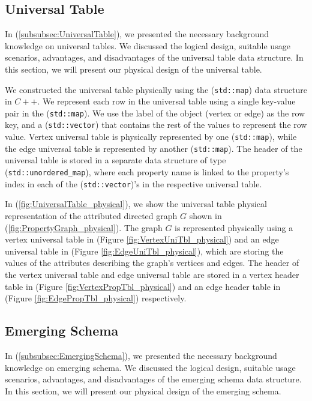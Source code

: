 {\subsection{Universal Table}
\label{subsec:PhyDesign-UniversalTable}

In (\ref{subsubsec:UniversalTable}), we presented the necessary background knowledge on universal tables. We discussed the logical design, suitable usage scenarios, advantages, and disadvantages of the universal table data structure. In this section, we will present our physical design of the universal table.

We constructed the universal table physically using the (\texttt{std::map}) data structure in $C++$. We represent each row in the universal table using a single key-value pair in the (\texttt{std::map}).  We use the label of the object (vertex or edge) as the row key, and a (\texttt{std::vector}) that contains the rest of the values to represent the row value. Vertex universal table is physically represented by one (\texttt{std::map}), while the edge universal table is represented by another (\texttt{std::map}). The header of the universal table is stored in a separate data structure of type (\texttt{std::unordered\_map}), where each property name is linked to the property's index in each of the (\texttt{std::vector})'s in the respective universal table.

In (\ref{fig:UniversalTable_physical}), we show the universal table physical representation of the attributed directed graph $G$ shown in (\ref{fig:PropertyGraph_physical}). The graph $G$ is represented physically using a vertex universal table in (Figure \ref{fig:VertexUniTbl_physical}) and an edge universal table in (Figure \ref{fig:EdgeUniTbl_physical}), which are storing the values of the attributes describing the graph's vertices and edges. The header of the vertex universal table and edge universal table are stored in a vertex header table in (Figure \ref{fig:VertexPropTbl_physical}) and an edge header table in (Figure \ref{fig:EdgePropTbl_physical}) respectively. 


\subsection{Emerging Schema}
\label{subsec:PhyDesign-EmergingSchema}

In (\ref{subsubsec:EmergingSchema}), we presented the necessary background knowledge on emerging schema. We discussed the logical design, suitable usage scenarios, advantages, and disadvantages of the emerging schema data structure. In this section, we will present  our physical design of the emerging schema.

}
